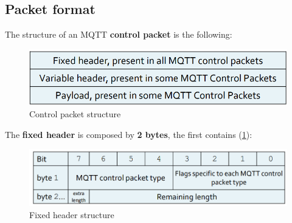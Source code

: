 \documentclass[10pt,a4paper]{report}
\theoremstyle{definition}
\begin{document}
\subsection{Packet format}\label{sec:packet-format}
The structure of an MQTT \textbf{control packet} is the following:
\begin{figure}[h!]
	\centering\includegraphics[scale=0.40]{images/Pasted image 20230304101920.png}
	\caption{Control packet structure}
\end{figure}

The \textbf{fixed header} is composed by \textbf{2 bytes}, the first contains (\ref{fixed-header-bytes}):
\begin{figure}[h]
	\centering
	\includegraphics[scale=0.35]{images/Pasted image 20230304101933.png}
	\caption{Fixed header structure}\label{fixed-header-bytes}
\end{figure}
\end{document}
